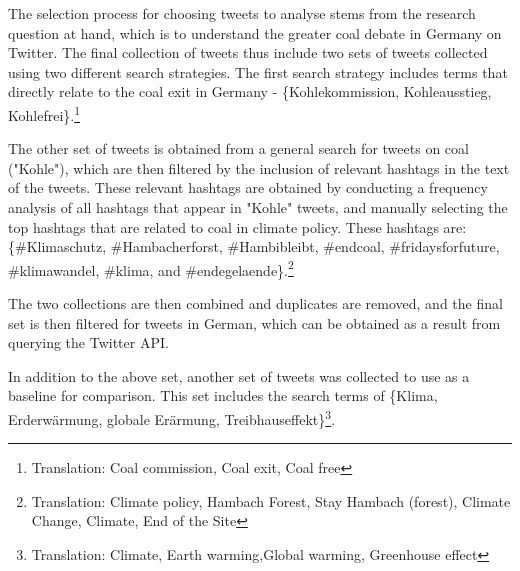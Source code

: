 \documentclass[10pt,twocolumn,twoside,lineno]{pnas-new}
\begin{document}
The selection process for choosing tweets to analyse stems from the research question at hand, which is to understand the greater coal debate in Germany on Twitter. The final collection of tweets thus include two sets of tweets collected using two different search strategies. The first search strategy includes terms that directly relate to the coal exit in Germany - \{Kohlekommission, Kohleausstieg, Kohlefrei\}.\footnote{Translation: Coal commission, Coal exit, Coal free}

The other set of tweets is obtained from a general search for tweets on coal ("Kohle"), which are then filtered by the inclusion of relevant hashtags in the text of the tweets. These relevant hashtags are obtained by conducting a frequency analysis of all hashtags that appear in "Kohle" tweets, and manually selecting the top hashtags that are related to coal in climate policy. These hashtags are:  \{\#Klimaschutz, \#Hambacherforst, \#Hambibleibt, \#endcoal, \#fridaysforfuture, \#klimawandel, \#klima, and \#endegelaende\}.\footnote{Translation: Climate policy, Hambach Forest, Stay Hambach (forest), Climate Change, Climate, End of the Site} 

The two collections are then combined and duplicates are removed, and the final set is then filtered for tweets in German, which can be obtained as a result from querying the Twitter API. 

In addition to the above set, another set of tweets was collected to use as a baseline for comparison. This set includes the search terms of \{Klima, Erderwärmung, globale Erärmung, Treibhauseffekt\}\footnote{Translation: Climate, Earth warming,Global warming, Greenhouse effect}.
\end{document}
